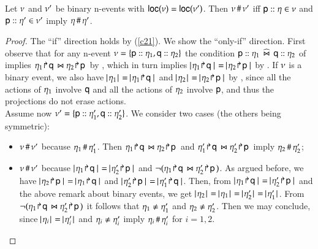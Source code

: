 \begin{lemma}
   Let $\nu$ and $\nu'$ be binary n-events with
  ${\sf loc}(\nu)={\sf loc}(\nu')$. Then $\nu\,\#\,\nu'$ iff
  ${\sf p}:: \eta\in\nu$ and ${\sf p}:: \eta'\in\nu'$
  imply $\eta\,\#\,\eta'$.
  \end{lemma} 
%
\begin{proof}
 The ``if'' direction holds  by
(\ref{c21}).  We show the
``only-if'' direction.  First observe that  for  any
n-event $\nu=\{{\sf p}:: \eta_1,{\sf q}:: \eta_2\}$ the
condition ${\sf p}:: \eta_1\;\,\widehat\Join\;\, {\sf q}:: \eta_2$ of
 implies
$\eta_1 \! \Rsh \! {\sf q}\,\Join\eta_2 \! \Rsh \! {\sf p}\,$ by
, which in turn implies
$\cardin{\projb{\procev_1}{\q}}=\cardin{\projb{\procev_2}{\pp}}$ by
.   If $\nu$ is a binary event, 
we also have $\cardin{\procev_1}=\cardin{\projb{\procev_1}{\q}}$ and
$\cardin{\procev_2}=\cardin{\projb{\procev_2}{\pp}}$ by , 
since  all the actions of $\eta_1$ involve ${\sf q}$ and all the
actions of $\eta_2$ involve ${\sf p}$, and thus 
the projections do not erase actions. \\
Assume  now 
$\nu'=\{{\sf p}:: \eta_1',{\sf q}:: \eta_2'\}$.
We consider two cases  (the others being symmetric):  
\begin{itemize}[label=--]
\item $\nu\,\#\,\nu'$  because 
  $\eta_1\,\#\,\eta_1'$.
   Then 
$\eta_1 \! \Rsh \! {\sf q}\,\Join\eta_2 \! \Rsh \! {\sf p}\,$ and
  $\eta_1' \! \Rsh \! {\sf q}\,\Join\eta_2' \! \Rsh \! {\sf p}\,$
  imply $\eta_2\,\#\,\eta_2'$; 
 \item $\nu\,\#\,\nu'$  because 
  $\cardin{\projb{\procev_1}{\q}}=\cardin{\projb{\procev'_2}{\pp}}$
  and $\neg(\eta_1 \! \Rsh \! {\sf q}\,\Join\eta'_2 \! \Rsh \! {\sf p}\,)$. 
   As argued before, 
  we have $\cardin{\projb{\procev_2}{\pp}}
  =\cardin{\projb{\procev_1}{\q}}$ and
  $\cardin{\projb{\procev'_2}{\pp}} =\cardin{\projb{\procev'_1}{\q}}$.
  Then, from
  $\cardin{\projb{\procev_1}{\q}}=\cardin{\projb{\procev'_2}{\pp}}$
  and the above remark about binary events, we get
  $\cardin{\procev_2}=\cardin{\procev_1} =\cardin{\procev'_2} =
  \cardin{\procev'_1}$. From
  $\neg(\eta_1 \! \Rsh \! {\sf q}\,\Join\eta'_2 \! \Rsh \! {\sf p}\,)$ it follows
  that $\eta_1 \neq \eta'_1$ and $\eta_2
  \neq \eta'_2$. Then we may conclude, since $\cardin{\procev_i} =
  \cardin{\procev'_i}$ and $\eta_i \neq \eta'_i$ imply
  $\eta_i \,\#\, \eta'_i$ for $i=1,2$.  \qedhere 
  \end{itemize} 
\end{proof} 

